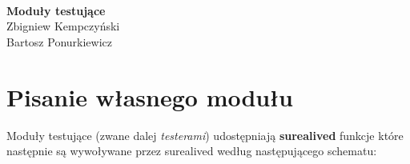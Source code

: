 \documentclass[polish,12pt]{article}
\begin{document}
\thispagestyle{empty}
~
\vspace{8em}
~
\begin{center}
\end{center}
\begin{center}
  \textbf{\Large Moduły testujące}\\
  \vspace{2em}
  \large
  Zbigniew Kempczyński\\
  Bartosz Ponurkiewicz
\end{center}
\newpage

\tableofcontents
\newpage

\section{Pisanie własnego modułu}
Moduły testujące (zwane dalej \textit{testerami}) udostępniają \textbf{surealived} funkcje
które następnie są wywoływane przez surealived według następującego schematu:
\begin{center}
\end{center}

\newpage
\end{document}

